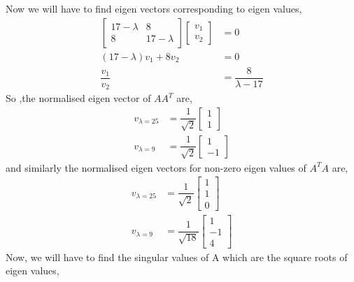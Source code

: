 \documentclass[12pt,a4paper]{article}
\begin{document}
{Now we will have to find eigen vectors corresponding to eigen values,
    \begin{align*}
        \begin{bmatrix}
                    17-\lambda & 8 \\
                    8 & 17-\lambda
                \end{bmatrix}
        \begin{bmatrix}
                    v_1 \\
                    v_2
                \end{bmatrix} &= 0 \\
        (17-\lambda)v_1 + 8v_2 &= 0 \\
       \dfrac{v_1}{v_2} &= \dfrac{8}{\lambda - 17} 
    \end{align*}
    So ,the normalised eigen vector of $AA^T$ are,
    \begin{align*}
        v_{\lambda = 25} &= \dfrac{1}{\sqrt{2}} 
        \begin{bmatrix}
                    1 \\
                    1
                \end{bmatrix}  \\
        v_{\lambda = 9} &= \dfrac{1}{\sqrt{2}} 
        \begin{bmatrix}
                    1 \\
                    -1
                \end{bmatrix}  
    \end{align*}
    and similarly the normalised eigen vectors for non-zero eigen values of $A^TA$ are,
    \begin{align*}
        v_{\lambda = 25} &= \dfrac{1}{\sqrt{2}} 
        \begin{bmatrix}
                    1 \\
                    1 \\
                    0
                \end{bmatrix}  \\
        v_{\lambda = 9} &= \dfrac{1}{\sqrt{18}} 
        \begin{bmatrix}
                    1 \\
                    -1 \\
                    4
                \end{bmatrix}  
    \end{align*}
    Now, we will have to find the singular values of A which are the square roots of eigen values,
}
\end{document}
